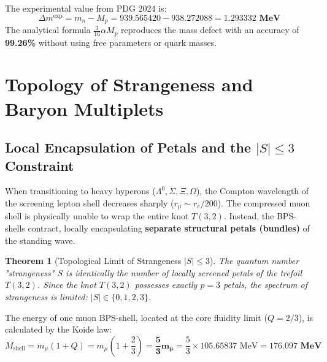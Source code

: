 \documentclass[12pt,a4paper]{article}
\newtheorem{theorem}{Theorem}
\begin{document}
		The experimental value from PDG 2024 is:
		\begin{equation}
			\Delta m^{\text{exp}} = m_n - M_p = 939.565420 - 938.272088 = \mathbf{1.293332 \text{ MeV}}
		\end{equation}
		The analytical formula $\frac{3}{16}\alpha M_p$ reproduces the mass defect with an accuracy of \textbf{99.26\%} without using free parameters or quark masses.
		
		\section{Topology of Strangeness and Baryon Multiplets}
		
		\subsection{Local Encapsulation of Petals and the $|S| \le 3$ Constraint}
		When transitioning to heavy hyperons ($\Lambda^0, \Sigma, \Xi, \Omega$), the Compton wavelength of the screening lepton shell decreases sharply ($r_\mu \sim r_e / 200$). The compressed muon shell is physically unable to wrap the entire knot $T(3,2)$. Instead, the BPS-shells contract, locally encapsulating \textbf{separate structural petals (bundles)} of the standing wave.
		
		\begin{theorem}[Topological Limit of Strangeness $|S| \le 3$]
			The quantum number "strangeness" $S$ is identically the number of locally screened petals of the trefoil $T(3,2)$. Since the knot $T(3,2)$ possesses exactly $p=3$ petals, the spectrum of strangeness is limited: $|S| \in \{0, 1, 2, 3\}$.
		\end{theorem}
		
		The energy of one muon BPS-shell, located at the core fluidity limit ($Q = 2/3$), is calculated by the Koide law:
		\begin{equation}
			M_{\text{shell}} = m_\mu (1 + Q) = m_\mu \left(1 + \frac{2}{3}\right) = \mathbf{\frac{5}{3} m_\mu} = \frac{5}{3} \times 105.65837 \text{ MeV} = \mathbf{176.097 \text{ MeV}}
		\end{equation}
		
\end{document}
